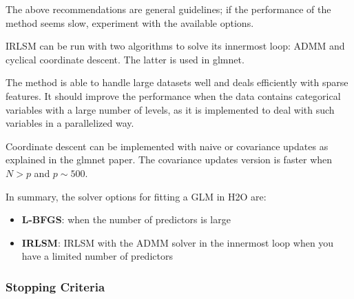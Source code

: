  The above recommendations are general guidelines; if the performance of the method seems slow, experiment with the available options. 

IRLSM can be run with two algorithms to solve its innermost loop: ADMM and cyclical coordinate descent. The latter is used in glmnet. 

The method is able to handle large datasets well and deals efficiently with sparse features. It should improve the performance when the data contains categorical variables with a large number of levels, as it is implemented to deal with such variables in a parallelized way. 

Coordinate descent can be implemented with naive or covariance updates as explained in the glmnet paper. The covariance updates version is faster when $N>p$ and $p \sim 500$. 

In summary, the solver options for fitting a GLM in H2O are:
\begin{itemize}
 \item \textbf{L-BFGS}: when the number of predictors is large
 \item \textbf{IRLSM}: IRLSM with the ADMM solver in the innermost loop when you have a limited number of predictors
\end{itemize}


\subsubsection{Stopping Criteria}

